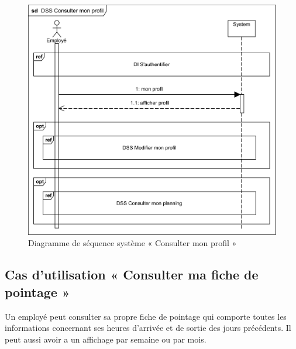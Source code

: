 \begin{figure}[h!]
     \centering
     \includegraphics[scale=1.18]{images/DSS/DSS Consulter mon profil.png}
     \caption{Diagramme de séquence système « Consulter mon profil »}
     \label{fig4}
\end{figure}
\clearpage
\subsection{Cas d'utilisation « Consulter ma  fiche de pointage »}
Un employé peut consulter sa propre fiche de pointage qui comporte toutes les
informations concernant ses heures d’arrivée et de sortie des jours précédents.
Il peut aussi avoir a un affichage par semaine ou par mois.
   

